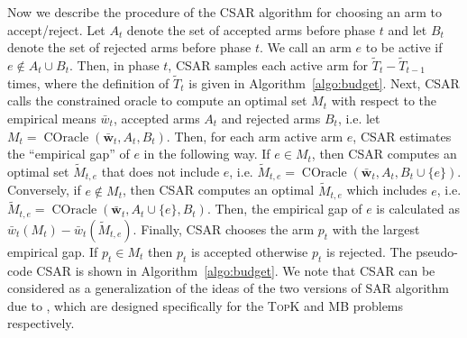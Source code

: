 \documentclass{article}
\newcommand{\AlgorithmBud}{{\small \textsf{CSAR}}\xspace}
\DeclareMathOperator{\COracle}{COracle}
\newcommand{\MultiIdent}{\textsc{TopK}\xspace}
\newcommand{\MultiBandit}{\textsc{MB}\xspace}
\renewcommand{\vec}[1]{\boldsymbol{#1}}
\begin{document}
Now we describe the procedure of the \AlgorithmBud algorithm for choosing an arm to accept/reject.
Let $A_t$ denote the set of accepted arms before phase $t$ and let $B_t$ denote the set of rejected arms before phase $t$.
We call an arm $e$ to be active if $e\not\in A_t\cup B_t$.
Then, in phase $t$, \AlgorithmBud samples each active arm for $\tilde T_t -\tilde T_{t-1}$ times, where the definition of $\tilde T_t$ is given in Algorithm~\ref{algo:budget}.
Next, \AlgorithmBud calls the constrained oracle to compute an optimal set $M_t$ with respect to the empirical means $\bar w_t$, accepted arms $A_t$ and rejected arms $B_t$, i.e. let $M_t = \COracle(\vec {\bar w}_t, A_t,B_t)$.
Then, for each arm active arm $e$, \AlgorithmBud estimates the ``empirical gap'' of $e$ in the following way.
If $e\in M_t$, then \AlgorithmBud computes an optimal set $\tilde M_{t,e}$ that does not include $e$, i.e. $\tilde M_{t,e} = \COracle(\vec {\bar w}_t, A_t, B_t \cup \{e\})$.
Conversely, if $e\not\in M_t$, then \AlgorithmBud computes an optimal $\tilde M_{t,e}$ which includes $e$, i.e. $\tilde M_{t,e} = \COracle(\vec {\bar w}_t, A_t \cup \{e\}, B_t)$.
Then, the empirical gap of $e$ is calculated as $\bar w_t(M_t)-\bar w_t(\tilde M_{t,e})$.
Finally, \AlgorithmBud chooses the  arm $p_t$ with the largest empirical gap.
If $p_t\in M_t$ then $p_t$ is accepted otherwise $p_t$ is rejected.
The pseudo-code \AlgorithmBud is shown in Algorithm~\ref{algo:budget}.
We note that \AlgorithmBud can be considered as a generalization of the ideas of the two versions of SAR algorithm due to \citet{bubeck2013multiple}, which are designed specifically for the \MultiIdent and \MultiBandit problems respectively.
\end{document}
